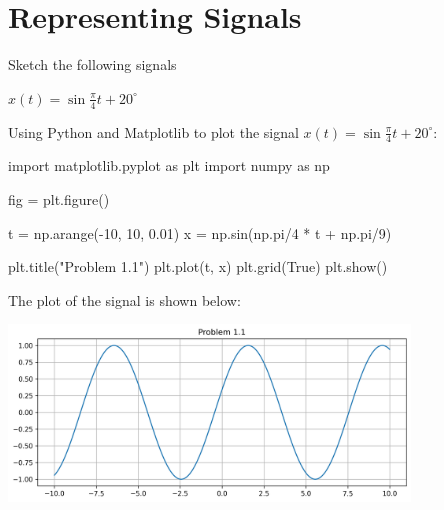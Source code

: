 \documentclass[a4paper, 10pt]{article}
\begin{document}
\subject[2110203 - Computer Engineering Mathematics II]


\section{Representing Signals}



\begin{problem}
Sketch the following signals
\end{problem}


\begin{tosubmit}
\begin{subproblems}
    \item \( x(t) = \sin\frac{\pi}{4} t + 20^\circ \)
\end{subproblems}

\par\noindent\submitsolution
Using Python and Matplotlib to plot the signal \( x(t) = \sin\frac{\pi}{4} t + 20^\circ \):
\begin{codingbox}
import matplotlib.pyplot as plt
import numpy as np

fig = plt.figure()

t = np.arange(-10, 10, 0.01)
x = np.sin(np.pi/4 * t + np.pi/9)

plt.title("Problem 1.1")
plt.plot(t, x)
plt.grid(True)
plt.show()
\end{codingbox}

The plot of the signal is shown below:
\begin{center}
    \includegraphics[width=0.8\textwidth]{images/problem_1_1.png}
\end{center}
\end{tosubmit}
\end{document}
